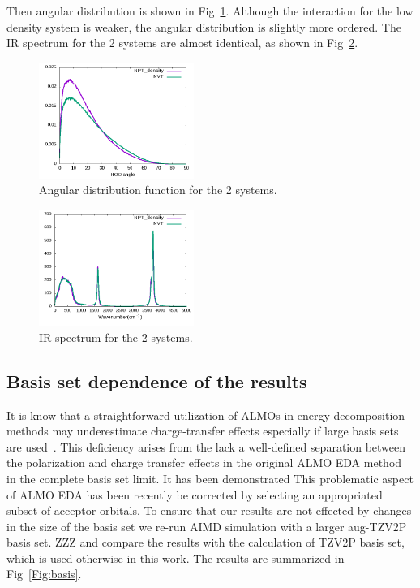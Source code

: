 \documentclass[prl,twocolumn,showpacs]{revtex4}
\begin{document}
Then angular distribution is shown in Fig~\ref{Fig:adfcp}. Although the interaction for the low density system is weaker, the angular distribution is slightly more ordered. The IR spectrum for the 2 systems are almost identical, as shown in Fig~\ref{Fig:ir_cp}.

\begin{figure}
\includegraphics[width=0.45\textwidth]{angular_NVT_NPTCP}
\caption{Angular distribution function for the 2 systems.}\label{Fig:adfcp}
\end{figure} 

\begin{figure}
\includegraphics[width=0.45\textwidth]{ir_NVT_NPTCP}
\caption{IR spectrum for the 2 systems.}\label{Fig:ir_cp}
\end{figure} 

\subsection{Basis set dependence of the results}

It is know that a straightforward utilization of ALMOs in energy decomposition methods may underestimate charge-transfer effects especially if large basis sets are used~\cite{horn2015polarization,herbert2016}. This deficiency arises from the lack a well-defined separation between the polarization and charge transfer effects in the original ALMO EDA method~\cite{khaliullin2007unravelling} in the complete basis set limit. It has been demonstrated This problematic aspect of ALMO EDA has been recently be corrected by selecting an appropriated subset of acceptor orbitals\cite{horn2015polarization}. To ensure that our results are not effected by changes in the size of the basis set we re-run AIMD simulation with a larger aug-TZV2P basis set. ZZZ and compare the results with the calculation of TZV2P basis set, which is used otherwise in this work. The results are summarized in Fig~\ref{Fig:basis}.
\end{document}
